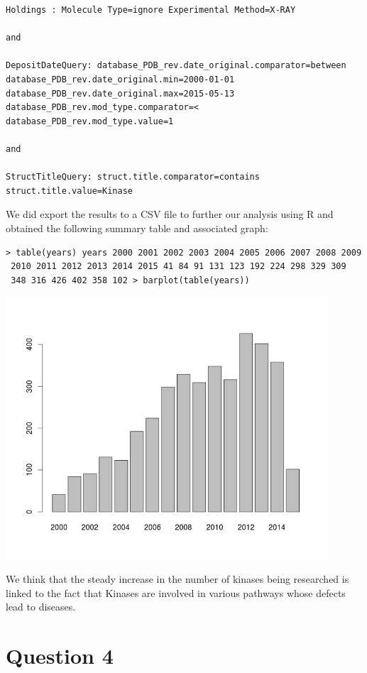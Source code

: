 \documentclass[11pt, a4paper,titlepage]{article}
\begin{document}
\begin{verbatim}
Holdings : Molecule Type=ignore Experimental Method=X-RAY 

and 

DepositDateQuery: database_PDB_rev.date_original.comparator=between 
database_PDB_rev.date_original.min=2000-01-01 database_PDB_rev.date_original.max=2015-05-13 
database_PDB_rev.mod_type.comparator=< database_PDB_rev.mod_type.value=1 

and 

StructTitleQuery: struct.title.comparator=contains struct.title.value=Kinase
\end{verbatim}

We did export the results to a CSV file to further our analysis using
R and obtained the following summary table and associated graph:

\begin{verbatim}
> table(years) years 2000 2001 2002 2003 2004 2005 2006 2007 2008 2009
 2010 2011 2012 2013 2014 2015 41 84 91 131 123 192 224 298 329 309
 348 316 426 402 358 102 > barplot(table(years))
\end{verbatim}

\includegraphics[width=12cm]{./Figures/pdb_kinases_growth.png}

We think that the steady increase in the number of kinases being
researched is linked to the fact that Kinases are involved in various
pathways whose defects lead to diseases. 

\section*{Question 4}
\end{document}
